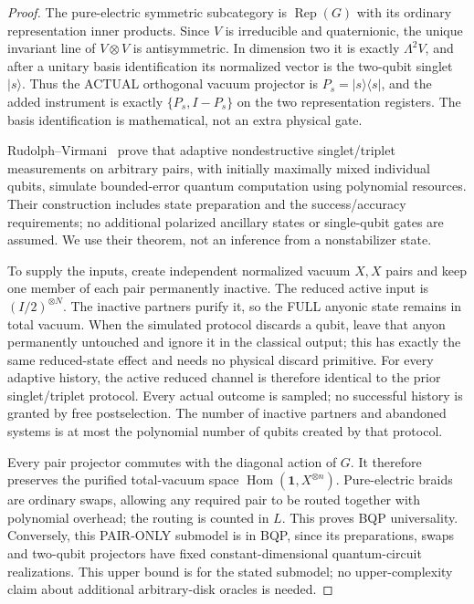 \documentclass[11pt]{amsart}
\theoremstyle{definition}\newtheorem{definition}[theorem]{Definition}
\newcommand{\one}{\mathbf1}
\newcommand{\Hom}{\operatorname{Hom}}
\begin{document}
\begin{proof}
The pure-electric symmetric subcategory is $\operatorname{Rep}(G)$ with its
ordinary representation inner products. Since $V$ is irreducible and
quaternionic, the unique invariant line of $V\otimes V$ is antisymmetric.
In dimension two it is exactly $\Lambda^2V$, and after a unitary basis
identification its normalized vector is the two-qubit singlet $|s\rangle$.
Thus the ACTUAL orthogonal vacuum projector is $P_s=|s\rangle\langle s|$,
and the added instrument is exactly $\{P_s,I-P_s\}$ on the two representation
registers. The basis identification is mathematical, not an extra physical gate.

Rudolph--Virmani~\cite{RV} prove that adaptive nondestructive singlet/triplet
measurements on arbitrary pairs, with initially maximally mixed individual
qubits, simulate bounded-error quantum computation using polynomial resources.
Their construction includes state preparation and the success/accuracy
requirements; no additional polarized ancillary states or single-qubit gates
are assumed. We use their theorem, not an inference from a nonstabilizer state.

To supply the inputs, create independent normalized vacuum $X,X$ pairs and
keep one member of each pair permanently inactive. The reduced active input
is $(I/2)^{\otimes N}$. The inactive partners purify it, so the FULL anyonic
state remains in total vacuum. When the simulated protocol discards a qubit,
leave that anyon permanently untouched and ignore it in the classical output;
this has exactly the same reduced-state effect and needs no physical discard
primitive. For every adaptive history, the active reduced channel is therefore
identical to the prior singlet/triplet protocol. Every actual outcome is sampled;
no successful history is granted by free postselection. The number of inactive
partners and abandoned systems is at most the polynomial number of qubits
created by that protocol.

Every pair projector commutes with the diagonal action of $G$. It therefore
preserves the purified total-vacuum space $\Hom(\one,X^{\otimes n})$.
Pure-electric braids are ordinary
swaps, allowing any required pair to be routed together with polynomial
overhead; the routing is counted in $L$. This proves BQP universality.
Conversely, this PAIR-ONLY submodel is in BQP, since its preparations, swaps
and two-qubit projectors have fixed constant-dimensional quantum-circuit
realizations. This upper bound is for the stated submodel; no upper-complexity
claim about additional arbitrary-disk oracles is needed.
\end{proof}
\end{document}
